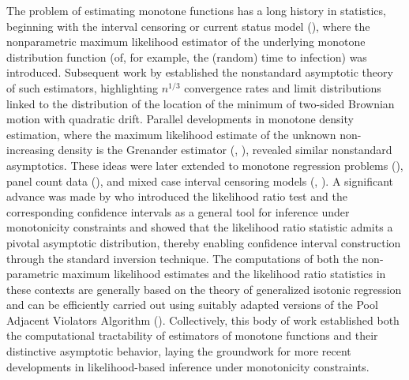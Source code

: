\documentclass[12pt]{amsart}
\theoremstyle{plain}
\theoremstyle{remark}
\numberwithin{equation}{section}
\begin{document}
The problem of estimating monotone functions has a long history in statistics, beginning with the interval censoring or {current status model} (\cite{MR73895}), where the nonparametric maximum likelihood estimator of the underlying monotone distribution function (of, for example, the (random) time to infection) was introduced. 
Subsequent work by \cite{groeneboom1992information} established the nonstandard asymptotic theory of such estimators, highlighting $n^{1/3}$ convergence rates and limit distributions linked to the distribution of the location of the minimum of two-sided Brownian motion with quadratic drift. 
Parallel developments in {monotone density estimation}, where the maximum likelihood estimate of the unknown non-increasing density is the Grenander estimator (\cite{grenander1956theory}, \cite{GroeneboomP}), revealed similar nonstandard asymptotics. 
These ideas were later extended to monotone regression problems (\cite{brunk1969estimation}), panel count data (\cite{wellner2000two}), and mixed case interval censoring models (\cite{schick2000consistency}, \cite{song2004estimation}). A significant advance was made by \cite{banerjee2001likelihood}
who introduced the likelihood ratio test and the corresponding confidence intervals as a general tool for inference under monotonicity constraints and showed that the likelihood ratio statistic admits a pivotal asymptotic distribution, thereby enabling confidence interval construction through the standard
inversion technique. The computations of both the non-parametric maximum likelihood estimates and the likelihood ratio statistics in these contexts are generally based on the theory of generalized
isotonic regression and can be efficiently carried out using suitably adapted versions of the Pool Adjacent Violators Algorithm (\cite{robertson1988order}).
Collectively, this body of work established both the computational tractability of estimators of monotone functions and their distinctive asymptotic behavior, laying the groundwork for more recent developments in likelihood-based inference under monotonicity constraints.
\end{document}
